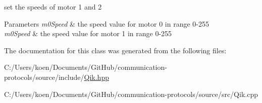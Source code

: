 set the speeds of motor 1 and 2 


\begin{DoxyParams}{Parameters}
{\em m0\+Speed} & the speed value for motor 0 in range 0-\/255 \\
\hline
{\em m0\+Speed} & the speed value for motor 1 in range 0-\/255 \\
\hline
\end{DoxyParams}


The documentation for this class was generated from the following files\+:\begin{DoxyCompactItemize}
\item 
C\+:/\+Users/koen/\+Documents/\+Git\+Hub/communication-\/protocols/source/include/\hyperlink{_qik_8hpp}{Qik.\+hpp}\item 
C\+:/\+Users/koen/\+Documents/\+Git\+Hub/communication-\/protocols/source/src/Qik.\+cpp\end{DoxyCompactItemize}
